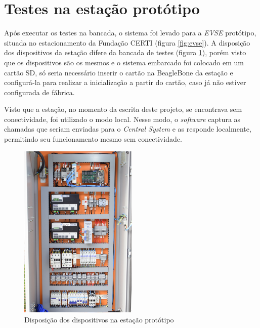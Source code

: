   \section{Testes na estação protótipo}
  \label{tests:evse}

    Após executar os testes na bancada, o sistema foi levado para a \textit{\ac{EVSE}} protótipo, situada no estacionamento da Fundação CERTI (figura \ref{fig:evse}). A disposição dos dispositivos da estação difere da bancada de testes (figura \ref{fig:setup-evse}), porém visto que os dispositivos são os mesmos e o sistema embarcado foi colocado em um cartão SD, só seria necessário inserir o cartão na BeagleBone da estação e configurá-la para realizar a inicialização a partir do cartão, caso já não estiver configurada de fábrica.

    Visto que a estação, no momento da escrita deste projeto, se encontrava sem conectividade, foi utilizado o modo local. Nesse modo, o \textit{software} captura as chamadas que seriam enviadas para o \textit{Central System} e as responde localmente, permitindo seu funcionamento mesmo sem conectividade. 

    \begin{figure}[H]
      \begin{center}
        \includegraphics[width=0.5\textwidth,natwidth=1420,natheight=2130]{assets/images/setup-evse.jpg}
        \caption{Disposição dos dispositivos na estação protótipo}
        \label{fig:setup-evse}
      \end{center}
    \end{figure}


